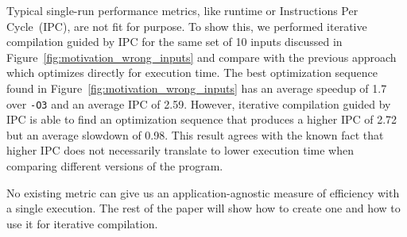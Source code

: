     Typical single-run performance metrics, like runtime or Instructions Per Cycle~(IPC), are not fit for purpose.
    To show this, we performed iterative compilation guided by IPC for the same set of 10 inputs
    discussed in Figure~\ref{fig:motivation_wrong_inputs} and compare with the previous approach which optimizes directly for execution time.
    The best optimization sequence found in Figure~\ref{fig:motivation_wrong_inputs}
    has an average speedup of 1.7 over \texttt{-O3} and an average IPC of 2.59.
    However, iterative compilation guided by IPC is able to find an optimization
    sequence that produces a higher IPC of 2.72 but an average slowdown of 0.98.
    This result agrees with the known fact that higher IPC does not necessarily translate to lower execution time when comparing different versions of the program.
    
    No existing metric can give us an application-agnostic measure of efficiency with a single execution. The rest of the paper will show
    how to create one and how to use it for iterative compilation. 



